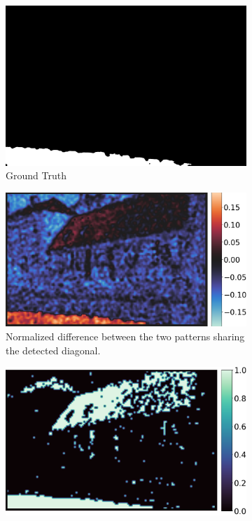 \documentclass{ipol}
\begin{document}
\begin{figure}[ht]
        \begin{subfigure}[t]{.22\linewidth}
                \includegraphics[width=\linewidth]{images/forged_house/mask_s.png}
                \caption{Ground Truth}
        \end{subfigure}\hfill%
        \begin{subfigure}[t]{.258\linewidth}
                \includegraphics[width=\linewidth]{images/forged_house/out_diff_grid.png}
                \caption{Normalized difference between the two patterns sharing the detected diagonal.}
        \end{subfigure}\hfill%
        \begin{subfigure}[t]{.245\linewidth}
                \includegraphics[width=\linewidth]{images/forged_house/out_inconsistent_grid_fig.png}

\end{subfigure}
\end{figure}
\end{document}
